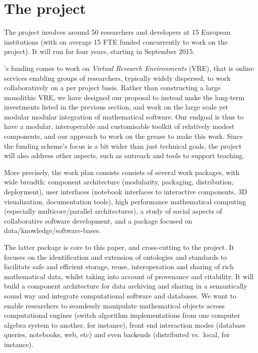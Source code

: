 \section{The \ODK project}\label{sec:odk}
The \ODK project involves around 50 researchers and developers at 15 European institutions (with on average 15 FTE funded concurrently to work on the project). It will run for four years, starting in September 2015.

\ODK's funding comes to work on \emph{Virtual Research Environments} (VRE), that is online services enabling groups of researchers, typically widely dispersed, to work collaboratively on a per project basis. Rather than constructing a large monolithic VRE, we have designed our proposal to instead make the long-term investments listed in the previous section, and work on the large scale yet modular modular integration of mathematical software. Our endgoal is thus to have a modular, interoperable and customisable toolkit of relatively modest components, and our approach to work on the grease to make this work. Since the funding scheme's focus is a bit wider than just technical goals, the project will also address other aspects, such as outreach and tools to support teaching. 

More precisely, the \ODK work plan consists consists of several work packages, with wide breadth: component architecture (modularity, packaging, distribution, deployment), user interfaces (\Jupyter notebook interfaces to interactive components, 3D visualization, documentation tools), high performance mathematical computing (especially multicore/parallel architectures), a study of social aspects of collaborative software development, and a package focused on data/knowledge/software-bases. 

The latter package is core to this paper, and cross-cutting to the \ODK project. It focuses on the identification and extension of ontologies and standards to facilitate safe and efficient storage, reuse, interoperation and sharing of rich mathematical data, whilst taking into account of provenance and citability. It will build a component architecture for data archiving and sharing in a semantically sound way and integrate computational software and databases. We want to  enable researchers to seamlessly manipulate mathematical objects across computational engines (switch algorithm implementations from one computer algebra system to another, for instance), front end interaction modes (database queries, notebooks, web, etc) and even backends (distributed vs.~local, for instance). 



